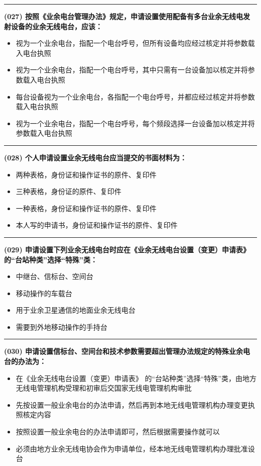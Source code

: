 \documentclass[twocolumn]{ctexart}  %
\begin{document}
\noindent\rule{0.5\textwidth}{1pt}
\heiti \textbf{(027) 按照《业余电台管理办法》规定，申请设置使用配备有多台业余无线电发射设备的业余无线电台，应该：} \songti {\color{gray} [LK0010] }
\begin{itemize}
	\item  视为一个业余电台，指配一个电台呼号，但所有设备均应经过核定并将参数载入电台执照
	\item  视为一个业余电台，指配一个电台呼号，其中只需有一台设备加以核定并将参数载入电台执照
	\item  每台设备视为一个业余电台，各指配一个电台呼号，并都应经过核定并将参数载入电台执照
	\item  视为一个业余电台，指配一个电台呼号，每个频段选择一台设备加以核定并将参数载入电台执照
\end{itemize}


\noindent\rule{0.5\textwidth}{1pt}
\heiti \textbf{(028) 个人申请设置业余无线电台应当提交的书面材料为：} \songti {\color{gray} [LK0023] }
\begin{itemize}
	\item  两种表格，身份证和操作证书的原件、复印件
	\item  三种表格，身份证的原件、复印件
	\item  一种表格，身份证和操作证书的原件、复印件
	\item  本人写的申请书，身份证和操作证书的原件、复印件
\end{itemize}


\noindent\rule{0.5\textwidth}{1pt}
\heiti \textbf{(029) 申请设置下列业余无线电台时应在《业余无线电台设置（变更）申请表》 的“台站种类”选择“特殊”类：} \songti {\color{gray} [LK0028] }
\begin{itemize}
	\item  中继台、信标台、空间台
	\item  移动操作的车载台
	\item  用于业余卫星通信的地面业余无线电台
	\item  需要到外地移动操作的手持台
\end{itemize}


\noindent\rule{0.5\textwidth}{1pt}
\heiti \textbf{(030) 申请设置信标台、空间台和技术参数需要超出管理办法规定的特殊业余电台的办法为：} \songti {\color{gray} [LK0029] }
\begin{itemize}
	\item  在《业余无线电台设置（变更）申请表》 的“台站种类”选择“特殊”类，由地方无线电管理机构受理和初审后交国家无线电管理机构审批
	\item  先按设置一般业余电台的办法申请，然后再到本地无线电管理机构办理变更执照核定内容
	\item  按照设置一般业余电台的办法申请即可，然后根据需要操作就可以
	\item  必须由地方业余无线电协会作为申请单位，经本地无线电管理机构办理批准设台
\end{itemize}
\end{document}

